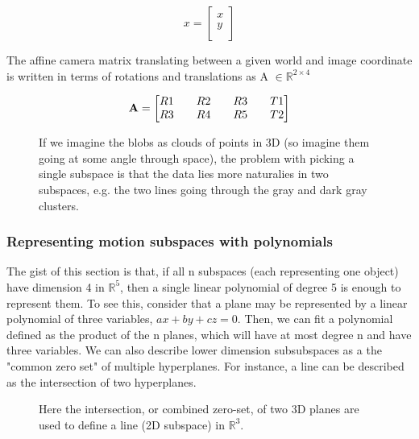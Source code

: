 \documentclass[a4paper]{article}
\begin{document}
\begin{equation} x = \begin{bmatrix} x \\ y \\ \end{bmatrix} \end{equation}

The affine camera matrix translating between a given world and image coordinate is written in terms of rotations and translations as A $\in
\mathbb{R}^{2 \times 4}$

\begin{equation} {\bf A} = \begin{bmatrix} R1 && R2 && R3 && T1 \\ R3 && R4 && R5 && T2 \\ \end{bmatrix} \end{equation}

 \begin{figure} \centering
     \caption{If we imagine the blobs as clouds of points in 3D (so imagine them going at some angle through space), the  problem with picking a
 single subspace is that the data lies more naturalies in two subspaces, e.g. the two lines going through the gray and dark gray clusters.}
 \end{figure}

\subsubsection{Representing motion subspaces with polynomials}

 The gist of this section is that, if all n subspaces (each representing one object) have dimension 4 in $\mathbb{R}^5$, then a single linear
 polynomial of degree 5 is enough to represent them. To see this, consider that a plane may be represented by a linear polynomial of three variables,
 $ax+by+cz = 0$. Then, we can fit a polynomial defined as the product of the n planes, which will have at most degree n and have three variables. We
 can also describe lower dimension subsubspaces as a the "common zero set" of multiple hyperplanes. For instance, a line can be described as the
 intersection of two hyperplanes. 

 \begin{figure} \centering
     \caption{Here the intersection, or combined zero-set, of two 3D planes are used to define a line (2D subspace) in $\mathbb{R}^3$.} \end{figure}
\end{document}
